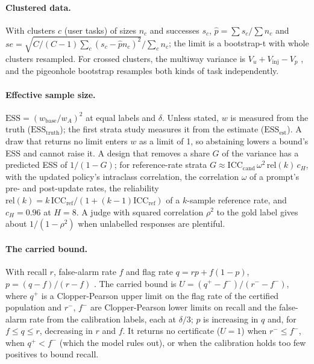 \paragraph{Clustered data.} With clusters $c$ (user tasks) of sizes $n_c$ and successes $s_c$, $\hat p=\sum s_c/\sum
n_c$ and $se=\sqrt{C/(C-1)\sum_c(s_c-\hat pn_c)^2}/\sum_cn_c$; the limit is a bootstrap-t with whole clusters resampled.
For crossed clusters, the multiway variance is $V_u+V_{\text{inj}}-V_p$ \citep{cameron2011multiway}, and the pigeonhole
bootstrap \citep{owen2007pigeonhole} resamples both kinds of task independently.

\paragraph{Effective sample size.} $\mathrm{ESS}=(w_{\text{base}}/w_A)^2$ at equal labels and $\delta$. Unless stated,
$w$ is measured from the truth ($\mathrm{ESS}_{\text{truth}}$); the first strata study measures it from the estimate
($\mathrm{ESS}_{\text{est}}$). A draw that returns no limit enters $w$ as a limit of 1, so abstaining lowers a bound's ESS and cannot raise it. A design that removes a share $G$ of the variance has a predicted ESS of $1/(1-G)$; for
reference-rate strata $G\approx\mathrm{ICC}_{\text{cand}}\,\omega^2\,\mathrm{rel}(k)\,c_H$, with the updated policy's
intraclass correlation, the correlation $\omega$ of a prompt's pre- and post-update rates, the reliability
$\mathrm{rel}(k)=k\,\mathrm{ICC}_{\text{ref}}/(1+(k-1)\mathrm{ICC}_{\text{ref}})$ of a $k$-sample reference rate, and
$c_H=0.96$ at $H=8$. A judge with squared correlation $\rho^2$ to the gold label gives about $1/(1-\rho^2)$ when
unlabelled responses are plentiful.

\paragraph{The carried bound.} With recall $r$, false-alarm rate $f$ and flag rate $q=rp+f(1-p)$, $p=(q-f)/(r-f)$
\citep{rogan1978}. The carried bound is $U=(q^{+}-f^{-})/(r^{-}-f^{-})$, where $q^{+}$ is a Clopper-Pearson upper limit
on the flag rate of the certified population and $r^{-}$, $f^{-}$ are Clopper-Pearson lower limits on recall and the
false-alarm rate from the calibration labels, each at $\delta/3$; $p$ is increasing in $q$ and, for $f\le q\le r$, decreasing in
$r$ and $f$. It returns no certificate ($U=1$) when $r^{-}\le f^{-}$, when $q^{+}<f^{-}$ (which the model rules out), or when the
calibration holds too few positives to bound recall.

